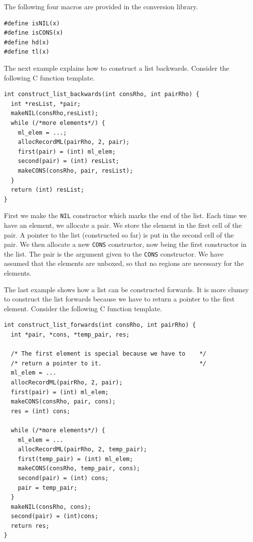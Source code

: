 \documentclass[12pt]{book}
\begin{document}
The following four macros are provided in the conversion library.

\begin{verbatim}
#define isNIL(x)
#define isCONS(x)
#define hd(x)
#define tl(x)
\end{verbatim}
                                
The next example explains how to construct a list backwards. Consider
the following C function template.

\begin{verbatim}
int construct_list_backwards(int consRho, int pairRho) {
  int *resList, *pair;
  makeNIL(consRho,resList);  
  while (/*more elements*/) {
    ml_elem = ...;
    allocRecordML(pairRho, 2, pair);
    first(pair) = (int) ml_elem;
    second(pair) = (int) resList;
    makeCONS(consRho, pair, resList);
  }
  return (int) resList;
}
\end{verbatim}

\noindent First we make the \texttt{NIL} constructor which marks the
end of the list. Each time we have an element, we allocate a pair. We
store the element in the first cell of the pair. A pointer to the list
(constructed so far) is put in the second cell of the pair. We then
allocate a new \texttt{CONS} constructor, now being the first
constructor in the list. The pair is the argument given to the
\texttt{CONS} constructor. We have assumed that the elements are
unboxed, so that no regions are necessary for the elements.

The last example shows how a list can be constructed forwards. It is more
clumsy to construct the list forwards because we have to return a pointer
to the first element. Consider the following C function template.

\begin{verbatim}
int construct_list_forwards(int consRho, int pairRho) {
  int *pair, *cons, *temp_pair, res;

  /* The first element is special because we have to    */
  /* return a pointer to it.                            */
  ml_elem = ...
  allocRecordML(pairRho, 2, pair);
  first(pair) = (int) ml_elem;
  makeCONS(consRho, pair, cons);
  res = (int) cons;

  while (/*more elements*/) {
    ml_elem = ...
    allocRecordML(pairRho, 2, temp_pair);
    first(temp_pair) = (int) ml_elem;
    makeCONS(consRho, temp_pair, cons);
    second(pair) = (int) cons;
    pair = temp_pair;
  }
  makeNIL(consRho, cons);
  second(pair) = (int)cons;
  return res;
}
\end{verbatim}
\end{document}
